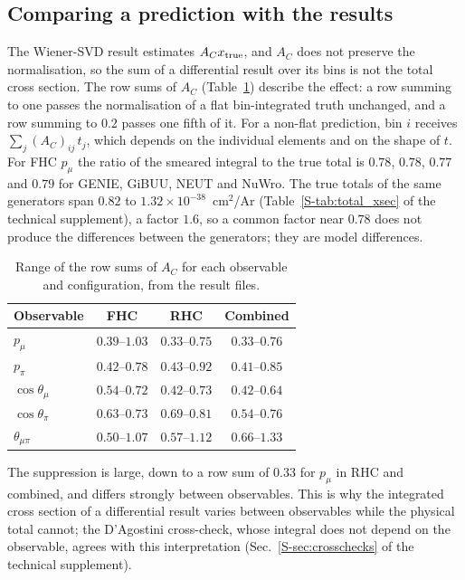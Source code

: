 \documentclass[11pt,a4paper]{article}
\newcommand{\suppref}[2]{#1~\ref{S-#2} of the technical supplement}
\begin{document}
\subsection{Comparing a prediction with the results}
\label{sec:ac_rowsums}

The Wiener-SVD result estimates $A_C x_{\rm true}$, and $A_C$ does not preserve the normalisation, so
the sum of a differential result over its bins is not the total cross section. The row sums of $A_C$
(Table~\ref{tab:ac_rowsums}) describe the effect: a row summing to one passes the normalisation of a
flat bin-integrated truth unchanged, and a row summing to $0.2$ passes one fifth of it. For a
non-flat prediction, bin $i$ receives $\sum_j (A_C)_{ij}\,t_j$, which depends on the individual
elements and on the shape of $t$. For FHC $p_\mu$ the ratio of the smeared integral to the true
total is $0.78$, $0.78$, $0.77$ and $0.79$ for GENIE, GiBUU, NEUT and NuWro. The true totals of the
same generators span $0.82$ to $1.32\times10^{-38}$~cm$^2$/Ar (\suppref{Table}{tab:total_xsec}), a
factor $1.6$, so a common factor near $0.78$ does not produce the differences between the
generators; they are model differences.

\begin{table}[H]
  \centering
  \caption{Range of the row sums of $A_C$ for each observable and configuration, from the result
    files.}
  \label{tab:ac_rowsums}
  \small
  \begin{tabular}{lccc}
\toprule
Observable & FHC & RHC & Combined \\
\midrule
$p_\mu$ & $0.39$--$1.03$ & $0.33$--$0.75$ & $0.33$--$0.76$ \\
$p_\pi$ & $0.42$--$0.78$ & $0.43$--$0.92$ & $0.41$--$0.85$ \\
$\cos\theta_\mu$ & $0.54$--$0.72$ & $0.42$--$0.73$ & $0.42$--$0.64$ \\
$\cos\theta_\pi$ & $0.63$--$0.73$ & $0.69$--$0.81$ & $0.54$--$0.76$ \\
$\theta_{\mu\pi}$ & $0.50$--$1.07$ & $0.57$--$1.12$ & $0.66$--$1.33$ \\
\bottomrule
\end{tabular}
\end{table}

The suppression is large, down to a row sum of $0.33$ for $p_\mu$ in RHC and combined, and differs
strongly between observables. This is why the integrated cross section of a differential result
varies between observables while the physical total cannot; the D'Agostini cross-check, whose
integral does not depend on the observable, agrees with this interpretation
(\suppref{Sec.}{sec:crosschecks}).
\end{document}
